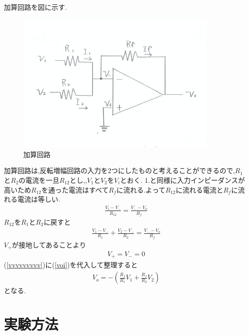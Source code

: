 \documentclass[a4j,10pt,dvipdfmx]{jarticle}
\begin{document}
加算回路を図に示す.
\begin{figure}[H]
  \begin{center}
  \includegraphics[height=7cm,width=10cm]{kasan.png}
  \caption{加算回路}
\end{center}
\end{figure}
加算回路は,反転増幅回路の入力を2つにしたものと考えることができるので,$R_1$と$R_2$の電流を一旦$R_{12}$とし,,$V_1$と$V_2$を$V_i$とおく.
1.と同様に入力インピーダンスが高いため$R_{12}$を通った電流はすべて$R_f$に流れる.よって$R_{12}$に流れる電流と$R_f$に流れる電流は等しい.
\begin{eqnarray}
  \label{vvvvvvvv}
\frac{{V_i}-{V_-}}{R_{12}} =  \frac{{V_-}-{V_o}}{R_f} 
\end{eqnarray}
$R_{12}$を$R_1$と$R_2$に戻すと
  \begin{eqnarray}
    \label{vvvvvvvvv}
  \frac{{V_1}-{V_-}}{R_1} + \frac{{V_2}-{V_-}}{R_2} =  \frac{{V_-}-{V_o}}{R_f} 
  \end{eqnarray}
  $V_+$が接地してあることより
  \begin{eqnarray}
    \label{voi}
  V_+ = V_- = 0
  \end{eqnarray}
(\ref{vvvvvvvvv})に(\ref{voi})を代入して整理すると
\begin{eqnarray}
  \label{voqi}
V_o = -(\frac{R_f}{R_1}V_1+\frac{R_f}{R_2}V_2)
\end{eqnarray}
となる.
\section{実験方法}
\end{document}
